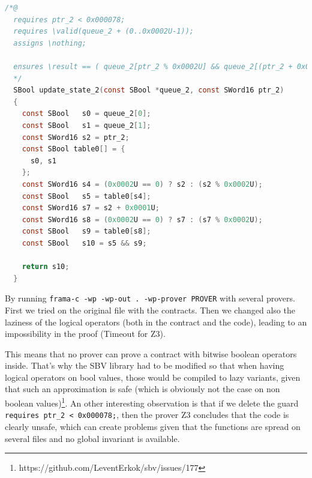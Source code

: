 \documentclass[a4paper,11pt,final]{article}
\begin{document}
  \begin{lstlisting}[language=C, keywordstyle=\color{blue}]
  /*@
  requires ptr_2 < 0x000078;
  requires \valid(queue_2 + (0..0x0002U-1));
  assigns \nothing;
  
  ensures \result == ( queue_2[ptr_2 % 0x0002U] && queue_2[(ptr_2 + 0x0001U) % 0x0002U]);
  */
  SBool update_state_2(const SBool *queue_2, const SWord16 ptr_2)
  {
    const SBool   s0 = queue_2[0];
    const SBool   s1 = queue_2[1];
    const SWord16 s2 = ptr_2;
    const SBool table0[] = {
      s0, s1
    };
    const SWord16 s4 = (0x0002U == 0) ? s2 : (s2 % 0x0002U);
    const SBool   s5 = table0[s4];
    const SWord16 s7 = s2 + 0x0001U;
    const SWord16 s8 = (0x0002U == 0) ? s7 : (s7 % 0x0002U);
    const SBool   s9 = table0[s8];
    const SBool   s10 = s5 && s9;
  
    return s10;
  }
  \end{lstlisting}
  By running \texttt{frama-c -wp -wp-out . -wp-prover PROVER} with several provers. First we tried on the original file with the contracts. Then we changed also the laziness of the logical operators (both in the contract and the code), leading to an impossibility in the proof (Timeout for Z3). 
  
  This means that no prover can prove a contract with bitwise boolean operators inside. That's why the SBV library had to be modified so that when having logical operators on bool values, those would be compiled to lazy variants, given that such an approximation is safe (which is obviously not the case on non boolean values)\footnote{https://github.com/LeventErkok/sbv/issues/177}. An other interesting observation is that if we delete the guard \texttt{requires ptr\_2 < 0x000078;}, then the prover Z3 concludes that the code is clearly unsafe, which can create problems given that the functions are spread on several files and no global invariant is available. 
  
\end{document}
